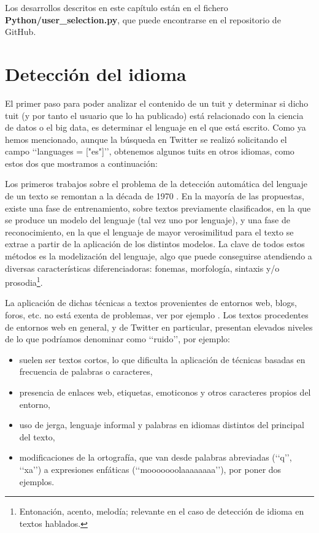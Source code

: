 Los desarrollos descritos en este capítulo están en el fichero {\bf Python/user\_selection.py}, 
que puede encontrarse en el repositorio de GitHub.


\section{Detección del idioma} 
\label{sect:deteccion_idioma}

El primer paso para poder analizar el contenido de un tuit y determinar si dicho tuit 
(y por tanto el usuario que lo ha publicado) está relacionado con la ciencia de datos o el big data,
es determinar el lenguaje en el que está escrito. Como ya hemos mencionado,
aunque la búsqueda en Twitter se realizó solicitando el campo \lq\lq languages = ["es"]\rq\rq,
obtenemos algunos tuits en otros idiomas, como estos dos 
que mostramos a continuación:


Los primeros trabajos sobre el problema de la detección automática del lenguaje de un texto
se remontan a la década de 1970 \cite{zissman-berkling}. En la mayoría de las propuestas, 
existe una fase de entrenamiento, sobre textos previamente clasificados, en la que se produce 
un modelo del lenguaje (tal vez uno por lenguaje), y una fase de reconocimiento, en la que 
el lenguaje de mayor verosimilitud para el texto se extrae a partir de la aplicación de los 
distintos modelos. La clave de todos estos métodos es la modelización del lenguaje, algo que puede 
conseguirse atendiendo a diversas características diferenciadoras: fonemas, morfología, 
sintaxis y/o prosodia\footnote{Entonación, acento, melodía; relevante en el
caso de detección de idioma en textos hablados.}. 

La aplicación de dichas técnicas a textos provenientes de entornos web, blogs,  foros, etc. 
no está exenta de problemas, ver por ejemplo \cite{almeida_estevez_piad}.
Los textos procedentes de entornos web en general, y de Twitter en particular, 
presentan elevados niveles de lo que podríamos denominar como \lq\lq ruido\rq\rq,
por ejemplo:
\begin{itemize}
\item suelen ser textos cortos, lo que dificulta la aplicación de técnicas basadas en frecuencia 
de palabras o caracteres,
\item presencia de enlaces web, etiquetas, emoticonos y otros caracteres propios del entorno,
\item uso de jerga, lenguaje informal y palabras en idiomas distintos del principal del texto,
\item modificaciones de la ortografía, que van desde palabras abreviadas (\lq\lq q\rq\rq, 
\lq\lq xa\rq\rq) a expresiones enfáticas (\lq\lq mooooooolaaaaaaaa\rq\rq), por poner dos 
ejemplos.
\end{itemize}


